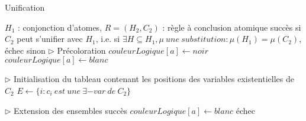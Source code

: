 \begin{center}
\begin{algorithm}[H]
\caption{Unification}\label{unification}
\begin{algorithmic}[1]
\REQUIRE $H_{1}$ : conjonction d'atomes, $R = (H_{2},C_{2})$ : r\`egle \`a conclusion atomique 
\ENSURE succ\`es si $C_{2}$ peut s'unifier avec $H_{1}$, i.e. si $\exists H \subseteq H_{1}, \mu\ une\ substitution : \mu(H_{1}) = \mu(C_{2})$, \'echec sinon 
\STATE $\triangleright$ Pr\'ecoloration
		\STATE $couleurLogique[a] \leftarrow noir$
	\ELSE
		\STATE $couleurLogique[a] \leftarrow blanc$
	\ENDIF
\ENDFOR 

\STATE $\triangleright$ Initialisation du tableau contenant les positions des variables existentielles de $C_{2}$
\STATE $E \leftarrow \{i : c_{i}\ est\ une\ \exists-var\ de\ C_{2}\}$

\STATE $\triangleright$ Extension des ensembles
			\RETURN succ\`es
		\ENDIF
	\ENDIF
	\STATE $couleurLogique[a] \leftarrow blanc$
\ENDFOR
\RETURN \'echec
\end{algorithmic}
\end{algorithm}
\end{center}

